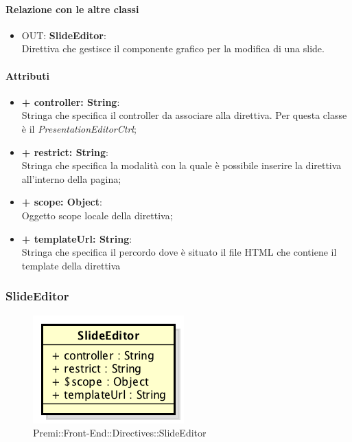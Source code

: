 	\paragraph{Relazione con le altre classi}
	\begin{itemize}
		\item OUT: \textbf{SlideEditor}:\\
		Direttiva che gestisce il componente grafico per la modifica di una \gls{slide}.
	\end{itemize}
	
	\paragraph{Attributi}
	\begin{itemize}
		\item \textbf{+ controller: String}:\\
			Stringa che specifica il controller da associare alla direttiva. Per questa classe è il \textit{PresentationEditorCtrl};
		\item \textbf{+ restrict: String}:\\
			Stringa che specifica la modalità con la quale è possibile inserire la direttiva all'interno della pagina;
		\item \textbf{+ scope: Object}:\\
			Oggetto scope locale della direttiva;
		\item \textbf{+ templateUrl: String}:\\
			Stringa che specifica il percordo dove è situato il file \gls{HTML} che contiene il \gls{template} della direttiva
	\end{itemize}
\newpage


\subsubsection{SlideEditor}
	\begin{figure}[h]
		\centering
		\includegraphics[width=0.4\linewidth]{img/premi_front_end_directives_slideeditor}
		\caption[Premi::Front-End::Directives::SlideEditor]{Premi::Front-End::Directives::SlideEditor}
	\end{figure}
	
